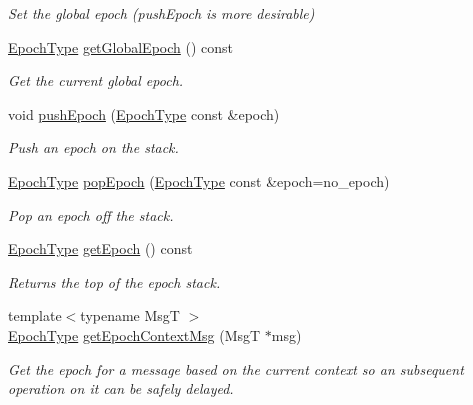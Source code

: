 \begin{DoxyCompactItemize}
\begin{DoxyCompactList}\small\item\em Set the global epoch ({\ttfamily push\+Epoch} is more desirable) \end{DoxyCompactList}\item 
\hyperlink{namespacevt_a985a5adf291c34a3ca263b3378388236}{Epoch\+Type} \hyperlink{structvt_1_1messaging_1_1_active_messenger_abb892a84a906954d8769794ccfb0c638}{get\+Global\+Epoch} () const
\begin{DoxyCompactList}\small\item\em Get the current global epoch. \end{DoxyCompactList}\item 
void \hyperlink{structvt_1_1messaging_1_1_active_messenger_ac60a61b85392a5c40d2334919981963a}{push\+Epoch} (\hyperlink{namespacevt_a985a5adf291c34a3ca263b3378388236}{Epoch\+Type} const \&epoch)
\begin{DoxyCompactList}\small\item\em Push an epoch on the stack. \end{DoxyCompactList}\item 
\hyperlink{namespacevt_a985a5adf291c34a3ca263b3378388236}{Epoch\+Type} \hyperlink{structvt_1_1messaging_1_1_active_messenger_a0ff3c2d9bf6ccd66002679b93821229c}{pop\+Epoch} (\hyperlink{namespacevt_a985a5adf291c34a3ca263b3378388236}{Epoch\+Type} const \&epoch=no\+\_\+epoch)
\begin{DoxyCompactList}\small\item\em Pop an epoch off the stack. \end{DoxyCompactList}\item 
\hyperlink{namespacevt_a985a5adf291c34a3ca263b3378388236}{Epoch\+Type} \hyperlink{structvt_1_1messaging_1_1_active_messenger_a627a8b2918ad283edf386038cf5693ca}{get\+Epoch} () const
\begin{DoxyCompactList}\small\item\em Returns the top of the epoch stack. \end{DoxyCompactList}\item 
{\footnotesize template$<$typename MsgT $>$ }\\\hyperlink{namespacevt_a985a5adf291c34a3ca263b3378388236}{Epoch\+Type} \hyperlink{structvt_1_1messaging_1_1_active_messenger_aa60710a2d4a1ac7fe60113fd8cbb9809}{get\+Epoch\+Context\+Msg} (MsgT $\ast$msg)
\begin{DoxyCompactList}\small\item\em Get the epoch for a message based on the current context so an subsequent operation on it can be safely delayed. \end{DoxyCompactList}\item 

\end{DoxyCompactItemize}
